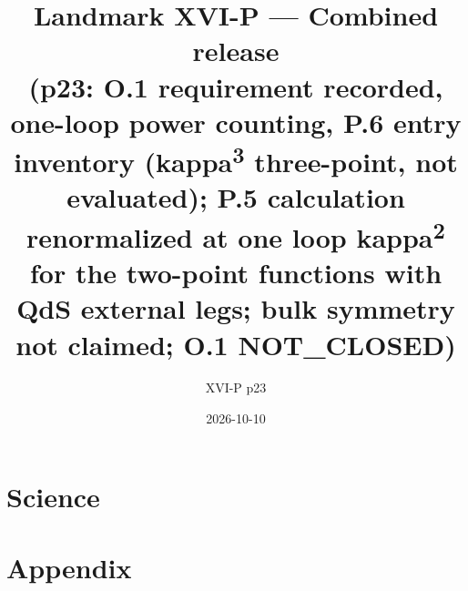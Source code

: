 \documentclass{article}
\title{Landmark XVI-P --- Combined release\\
\large (p23: O.1 requirement recorded, one-loop power counting, P.6 entry inventory (kappa\textsuperscript{3} three-point, not evaluated); P.5 calculation renormalized at one loop kappa\textsuperscript{2} for the two-point functions with QdS external legs; bulk symmetry not claimed; O.1 NOT\_CLOSED)}
\author{XVI-P p23}
\date{2026-10-10}
\begin{document}
\maketitle
\tableofcontents
\newpage
\part{Science}

\newpage
\part{Appendix}

\end{document}
